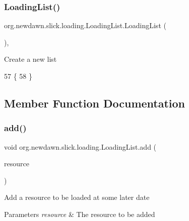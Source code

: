 \subsubsection{\texorpdfstring{Loading\+List()}{LoadingList()}}
{\footnotesize\ttfamily org.\+newdawn.\+slick.\+loading.\+Loading\+List.\+Loading\+List (\begin{DoxyParamCaption}{ }\end{DoxyParamCaption})\hspace{0.3cm}{\ttfamily [inline]}, {\ttfamily [private]}}

Create a new list 
\begin{DoxyCode}
57                           \{
58     \}
\end{DoxyCode}


\subsection{Member Function Documentation}
\mbox{\label{classorg_1_1newdawn_1_1slick_1_1loading_1_1_loading_list_af03554660af12999832ad6c0cb3fdc46}} 
\subsubsection{\texorpdfstring{add()}{add()}}
{\footnotesize\ttfamily void org.\+newdawn.\+slick.\+loading.\+Loading\+List.\+add (\begin{DoxyParamCaption}\item[{\mbox{\hyperlink{interfaceorg_1_1newdawn_1_1slick_1_1loading_1_1_deferred_resource}{Deferred\+Resource}}}]{resource }\end{DoxyParamCaption})\hspace{0.3cm}{\ttfamily [inline]}}

Add a resource to be loaded at some later date


\begin{DoxyParams}{Parameters}
{\em resource} & The resource to be added \\
\hline
\end{DoxyParams}

